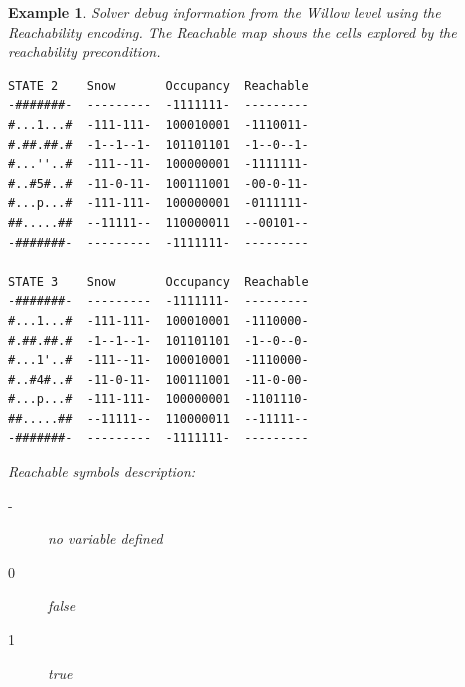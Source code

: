 \documentclass{report}
\theoremstyle{plain}
\newtheorem{example}{Example}[section]
\begin{document}
\begin{example}\label{ex:reachvar}
Solver debug information from the Willow level using the \emph{Reachability encoding}. The \textit{Reachable} map shows the cells explored by the reachability precondition.

\begin{center}
\begin{verbatim}
STATE 2    Snow       Occupancy  Reachable
-#######-  ---------  -1111111-  ---------
#...1...#  -111-111-  100010001  -1110011-
#.##.##.#  -1--1--1-  101101101  -1--0--1-
#...''..#  -111--11-  100000001  -1111111-
#..#5#..#  -11-0-11-  100111001  -00-0-11-
#...p...#  -111-111-  100000001  -0111111-
##.....##  --11111--  110000011  --00101--
-#######-  ---------  -1111111-  ---------

STATE 3    Snow       Occupancy  Reachable
-#######-  ---------  -1111111-  ---------
#...1...#  -111-111-  100010001  -1110000-
#.##.##.#  -1--1--1-  101101101  -1--0--0-
#...1'..#  -111--11-  100010001  -1110000-
#..#4#..#  -11-0-11-  100111001  -11-0-00-
#...p...#  -111-111-  100000001  -1101110-
##.....##  --11111--  110000011  --11111--
-#######-  ---------  -1111111-  ---------
\end{verbatim}
\end{center}

\vspace{1\baselineskip}

Reachable symbols description:

\begin{description}
    \item[-] no variable defined
    \item[0] false
    \item[1] true
\end{description}
\end{example}

\vspace{1\baselineskip}
\end{document}
